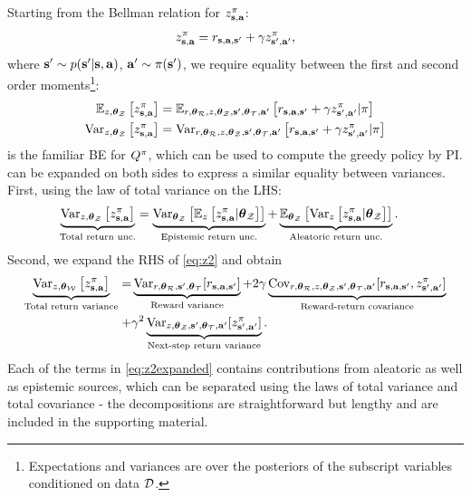 \documentclass{article}
\begin{document}
\begin{appendices}
Starting from the Bellman relation for $\zb$:
\begin{align*}
\zb = \rsanb + \gamma \znb,
\end{align*}
where $\bm{s}' \sim p(\ns | \s, \ac)$, $\ac' \sim \pi(\ns)$, we require equality between the first and second order moments\footnote{Expectations and variances are over the posteriors of the subscript variables conditioned on data $\data$.}:
\begin{align}
\E_{z, \thetamcz} \sqb{\zb} &= \E_{r, \thetamcr, z, \thetamcz, \ns, \thetamct, \ac'} \sqb{\rsanb + \gamma \znb | \pi} \label{eq:z1} \\
\Var_{z, \thetamcz} \sqb{\zb} &= \Var_{r, \thetamcr, z, \thetamcz, \ns, \thetamct, \ac'} \sqb{\rsanb + \gamma \znb | \pi} \label{eq:z2}
\end{align}
 is the familiar BE for $\Q$, which can be used to compute the greedy policy by PI.  can be expanded on both sides to express a similar equality between variances. First, using the law of total variance on the LHS:
\begin{align*}
\underbrace{\Var_{z, \thetamcz} \sqb{\zb}}_{\text{Total return unc.}} &= \underbrace{\Var_{\thetamcz} \sqb{\E_z\sqb{\zb | \thetamcz}}}_{\text{Epistemic return unc.}} + \underbrace{\E_{\thetamcz} \sqb{\Var_z\sqb{\zb | \thetamcz}}}_{\text{Aleatoric return unc.}}.
\end{align*}
Second, we expand the RHS of \cref{eq:z2} and obtain
\begin{align}
\underbrace{\Var_{z, \thetamcw} \sqb{\zb}}_{\text{Total return variance}} = &\underbrace{\Var_{r, \thetamcr, \ns, \thetamct}[\rsanb] }_{\text{Reward variance}} + 2\gamma \underbrace{\Cov_{r, \thetamcr, z, \thetamcz, \ns, \thetamct, \ac'}[\rsanb, \znb]}_{\text{Reward-return covariance}} \nonumber \\
+ & \gamma^2 \underbrace{\Var_{z, \thetamcz, \ns, \thetamct, \ac'}[\znb]}_{\text{Next-step return variance}}. \label{eq:z2expanded}
\end{align}
Each of the terms in \cref{eq:z2expanded} contains contributions from aleatoric as well as epistemic sources, which can be separated using the laws of total variance and total covariance \citep{weiss} - the decompositions are straightforward but lengthy and are included in the supporting material.


\end{appendices}
\end{document}
